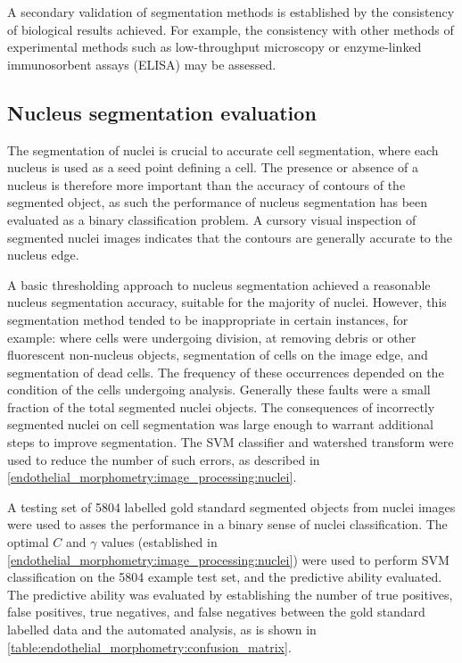 A secondary validation of segmentation methods is established by the consistency of biological results achieved. For example, the consistency with other methods of experimental methods such as low-throughput microscopy or enzyme-linked immunosorbent assays (ELISA) may be assessed.

\subsection{Nucleus segmentation evaluation}
\label{endothelial_morphometry:performance_evaluation:nucleus}
The segmentation of nuclei is crucial to accurate cell segmentation, where each nucleus is used as a seed point defining a cell. The presence or absence of a nucleus is therefore more important than the accuracy of contours of the segmented object, as such the performance of nucleus segmentation has been evaluated as a binary classification problem. A cursory visual inspection of segmented nuclei images indicates that the contours are generally accurate to the nucleus edge.

A basic thresholding approach to nucleus segmentation achieved a reasonable nucleus segmentation accuracy, suitable for the majority of nuclei. However, this segmentation method tended to be inappropriate in certain instances, for example: where cells were undergoing division, at removing debris or other fluorescent non-nucleus objects, segmentation of cells on the image edge, and segmentation of dead cells. The frequency of these occurrences depended on the condition of the cells undergoing analysis. Generally these faults were a small fraction of the total segmented nuclei objects. The consequences of incorrectly segmented nuclei on cell segmentation was large enough to warrant additional steps to improve segmentation. The SVM classifier and watershed transform were used to reduce the number of such errors, as described in \autoref{endothelial_morphometry:image_processing:nuclei}.

A testing set of 5804 labelled gold standard segmented objects from nuclei images were used to asses the performance in a binary sense of nuclei classification. The optimal $C$ and $\gamma$ values (established in \autoref{endothelial_morphometry:image_processing:nuclei}) were used to perform SVM classification on the 5804 example test set, and the predictive ability evaluated. The predictive ability was evaluated by establishing the number of true positives, false positives, true negatives, and false negatives between the gold standard labelled data and the automated analysis, as is shown in \autoref{table:endothelial_morphometry:confusion_matrix}.

